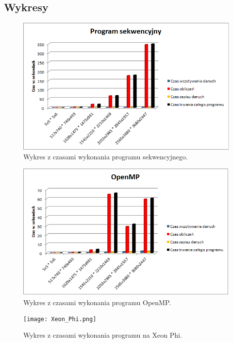 \documentclass[a4paper]{article}
\begin{document}
\subsection{Wykresy}
\begin{figure}[h!]
\includegraphics[width=1\textwidth]{sekw.png}
\caption{Wykres z czasami wykonania programu sekwencyjnego.}
\end{figure}

\begin{figure}[h!]
\includegraphics[width=1\textwidth]{OpenMP.png}
\caption{Wykres z czasami wykonania programu OpenMP.}
\end{figure}

\begin{figure}
\texttt{[image: Xeon\_Phi.png]}
\caption{Wykres z czasami wykonania programu na Xeon Phi.}
\end{figure}

\newpage
\end{document}
